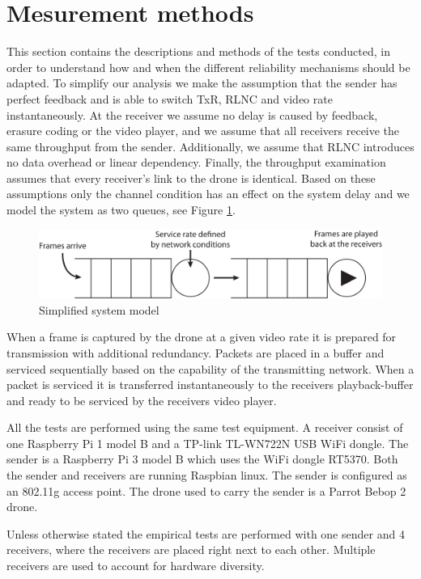 \section{Mesurement methods}\label{sec:measure}

This section contains the descriptions and methods of the tests conducted, in order to understand how and when the different reliability mechanisms should be adapted.
To simplify our analysis we make the assumption that the sender has perfect feedback and is able to switch TxR, RLNC and video rate instantaneously. At the receiver we assume no delay is caused by feedback, erasure coding or the video player, and we assume that all receivers receive the same throughput from the sender. Additionally, we assume that RLNC introduces no data overhead or linear dependency. Finally, the throughput examination assumes that every receiver's link to the drone is identical. Based on these assumptions only the channel condition has an effect on the system delay and we model the system as two queues, see Figure \ref{fig:buffer}. 
\begin{figure}[ht]
  \centering
  \includegraphics[width=\linewidth]{images/SimpleSystem.pdf}
  \caption{Simplified system model}
  \label{fig:buffer}
\end{figure}

When a frame is captured by the drone at a given video rate it is prepared for transmission with additional redundancy. Packets are placed in a buffer and serviced sequentially based on the capability of the transmitting network. When a packet is serviced it is transferred instantaneously to the receivers playback-buffer and ready to be serviced by the receivers video player.

All the tests are performed using the same test equipment. A receiver consist of one Raspberry Pi 1 model B and a TP-link TL-WN722N USB WiFi dongle. The sender is a Raspberry Pi 3 model B which uses the WiFi dongle RT5370. Both the sender and receivers are running Raspbian linux. The sender is configured as an 802.11g access point\cite{IEEE80211g}. The drone used to carry the sender is a Parrot Bebop 2 drone.

Unless otherwise stated the empirical tests are performed with one sender and 4 receivers, where the receivers are placed right next to each other. Multiple receivers are used to account for hardware diversity.
